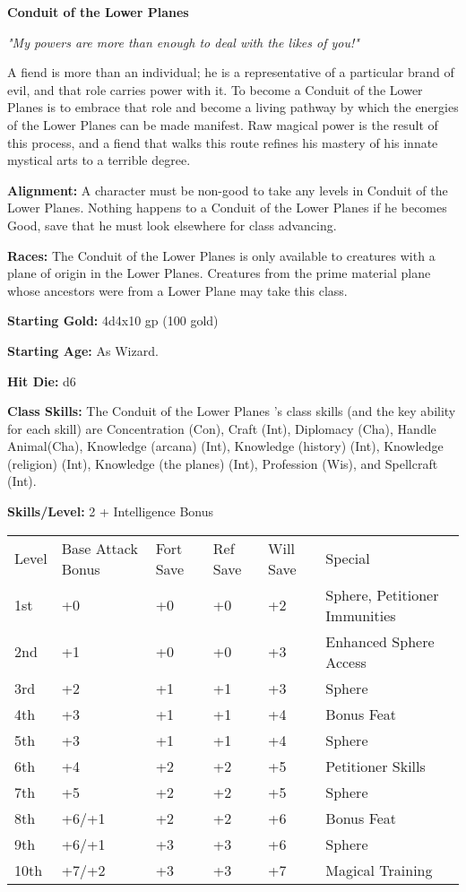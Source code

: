 \documentclass[10pt]{article}
\newcommand{\ability}[2]{\smallskip \textbf{#1} #2}
\newcommand{\classname}[1]{{\huge \textbf{#1}}}
\newcommand{\quot}[1]{\emph{#1}\bigskip}
\newcommand{\desc}[1]{#1 \medskip}
\begin{document}
\classname{Conduit of the Lower Planes}

\quot{"My powers are more than enough to deal with the likes of you!"}

\desc{A fiend is more than an individual; he is a representative of a particular brand of evil, and that role carries power with it. To become a Conduit of the Lower Planes is to embrace that role and become a living pathway by which the energies of the Lower Planes can be made manifest. Raw magical power is the result of this process, and a fiend that walks this route refines his mastery of his innate mystical arts to a terrible degree.}

\ability{Alignment:}{ A character must be non-good to take any levels in Conduit of the Lower Planes. Nothing happens to a Conduit of the Lower Planes if he becomes Good, save that he must look elsewhere for class advancing.}

\ability{Races:}{ The Conduit of the Lower Planes is only available to creatures with a plane of origin in the Lower Planes. Creatures from the prime material plane whose ancestors were from a Lower Plane may take this class.}

\ability{Starting Gold:}{ 4d4x10 gp (100 gold)}

\ability{Starting Age:}{ As Wizard.}

\ability{Hit Die:}{ d6}

\ability{Class Skills:}{ The Conduit of the Lower Planes 's class skills (and the key ability for each skill) are Concentration (Con), Craft (Int), Diplomacy (Cha), Handle Animal(Cha), Knowledge (arcana) (Int), Knowledge (history) (Int), Knowledge (religion) (Int), Knowledge (the planes) (Int), Profession (Wis), and Spellcraft (Int).}

\ability{Skills/Level:}{ 2 + Intelligence Bonus}

\begin{table}[tbh]
\begin{small}
\begin{tabular}{lp{2cm}p{1cm}p{1cm}p{1cm}l}
Level  &Base Attack Bonus &Fort  Save &Ref Save &Will Save &Special\\
1st &+0 &+0 &+0 &+2 &Sphere, Petitioner Immunities\\
2nd &+1 &+0 &+0 &+3 &Enhanced Sphere Access\\
3rd &+2 &+1 &+1 &+3 &Sphere\\
4th &+3 &+1 &+1 &+4 &Bonus Feat\\
5th &+3 &+1 &+1 &+4 &Sphere\\
6th &+4 &+2 &+2 &+5 &Petitioner Skills\\
7th &+5 &+2 &+2 &+5 &Sphere\\
8th &+6/+1 &+2 &+2 &+6 &Bonus Feat\\
9th &+6/+1 &+3 &+3 &+6 &Sphere\\
10th &+7/+2 &+3 &+3 &+7 &Magical Training\\
\end{tabular}
\end{small}
\end{table}
\end{document}
